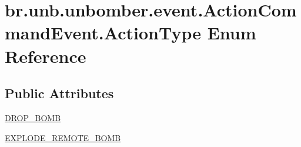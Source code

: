 \hypertarget{enumbr_1_1unb_1_1unbomber_1_1event_1_1_action_command_event_1_1_action_type}{\section{br.\+unb.\+unbomber.\+event.\+Action\+Command\+Event.\+Action\+Type Enum Reference}
\label{enumbr_1_1unb_1_1unbomber_1_1event_1_1_action_command_event_1_1_action_type}
}
\subsection*{Public Attributes}
\begin{DoxyCompactItemize}
\item 
\hyperlink{enumbr_1_1unb_1_1unbomber_1_1event_1_1_action_command_event_1_1_action_type_ad71f42826bb27a13056067eebc78576d}{D\+R\+O\+P\+\_\+\+B\+O\+M\+B}
\item 
\hyperlink{enumbr_1_1unb_1_1unbomber_1_1event_1_1_action_command_event_1_1_action_type_a0173dc382c347ad6650afd1a033e1012}{E\+X\+P\+L\+O\+D\+E\+\_\+\+R\+E\+M\+O\+T\+E\+\_\+\+B\+O\+M\+B}
\end{DoxyCompactItemize}


